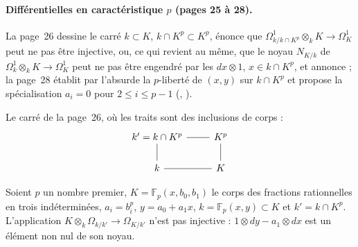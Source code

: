 \paragraph{Différentielles en caractéristique $p$ (pages 25 à 28).} La page~26 dessine le carré $k \subset K$, $k \cap K^p \subset K^p$, énonce que $\Omega^1_{k/k \cap K^p} \otimes_k K \to \Omega^1_K$ peut ne pas être injective, ou, ce qui revient au même, que le noyau $N_{K/k}$ de $\Omega^1_k \otimes_k K \to \Omega^1_K$ peut ne pas être engendré par les $dx \otimes 1$, $x \in k \cap K^p$, et annonce  ; la page~28 établit par l'absurde la $p$-liberté de $(x, y)$ sur $k \cap K^p$ et propose la spécialisation $a_i = 0$ pour $2 \leq i \leq p - 1$ (, ).

Le carré de la page~26, où les traits sont des inclusions de corps :
\[
\begin{tikzcd}
k' = k \cap K^p \arrow[r, no head] \arrow[d, no head] & K^p \arrow[d, no head] \\
k \arrow[r, no head] & K
\end{tikzcd}
\]

\begin{encadre}
\begin{contrexemple}\label{thm:22-differentielles}
Soient $p$ un nombre premier, $K = \mathbb F_p(x, b_0, b_1)$ le corps des fractions rationnelles en trois indéterminées, $a_i = b_i^p$, $y = a_0 + a_1 x$, $k = \mathbb F_p(x, y) \subset K$ et $k' = k \cap K^p$. L'application $K \otimes_k \Omega_{k/k'} \to \Omega_{K/k'}$ n'est pas injective : $1 \otimes dy - a_1 \otimes dx$ est un élément non nul de son noyau.
\end{contrexemple}
\end{encadre}

